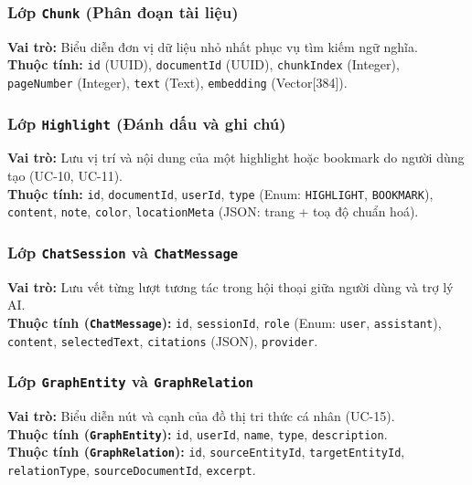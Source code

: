 \subsubsection{Lớp \texttt{Chunk} (Phân đoạn tài liệu)}
    \noindent\textbf{Vai trò:} Biểu diễn đơn vị dữ liệu nhỏ nhất phục vụ tìm kiếm ngữ nghĩa.\\
    \textbf{Thuộc tính:} \texttt{id} (UUID), \texttt{documentId} (UUID), \texttt{chunkIndex} (Integer), \texttt{pageNumber} (Integer), \texttt{text} (Text), \texttt{embedding} (Vector[384]).

\subsubsection{Lớp \texttt{Highlight} (Đánh dấu và ghi chú)}
    \noindent\textbf{Vai trò:} Lưu vị trí và nội dung của một highlight hoặc bookmark do người dùng tạo (UC-10, UC-11).\\
    \textbf{Thuộc tính:} \texttt{id}, \texttt{documentId}, \texttt{userId}, \texttt{type} (Enum: \texttt{HIGHLIGHT}, \texttt{BOOKMARK}), \texttt{content}, \texttt{note}, \texttt{color}, \texttt{locationMeta} (JSON: trang + toạ độ chuẩn hoá).

\subsubsection{Lớp \texttt{ChatSession} và \texttt{ChatMessage}}
    \noindent\textbf{Vai trò:} Lưu vết từng lượt tương tác trong hội thoại giữa người dùng và trợ lý AI.\\
    \textbf{Thuộc tính (\texttt{ChatMessage}):} \texttt{id}, \texttt{sessionId}, \texttt{role} (Enum: \texttt{user}, \texttt{assistant}), \texttt{content}, \texttt{selectedText}, \texttt{citations} (JSON), \texttt{provider}.

\subsubsection{Lớp \texttt{GraphEntity} và \texttt{GraphRelation}}
    \noindent\textbf{Vai trò:} Biểu diễn nút và cạnh của đồ thị tri thức cá nhân (UC-15).\\
    \textbf{Thuộc tính (\texttt{GraphEntity}):} \texttt{id}, \texttt{userId}, \texttt{name}, \texttt{type}, \texttt{description}.\\
    \textbf{Thuộc tính (\texttt{GraphRelation}):} \texttt{id}, \texttt{sourceEntityId}, \texttt{targetEntityId}, \texttt{relationType}, \texttt{sourceDocumentId}, \texttt{excerpt}.

